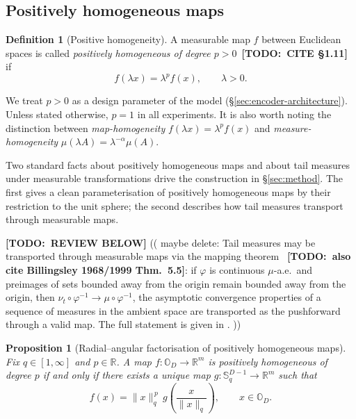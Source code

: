 \documentclass{article}
\newtheorem{proposition}[theorem]{Proposition}
\theoremstyle{definition}
\newtheorem{definition}[theorem]{Definition}
\newcommand{\todo}[1]{{\color{red}\textbf{[TODO:~#1]}}}
\begin{document}
\subsection{Positively homogeneous maps}
\label{sec:prelim:homogeneous}

\begin{definition}[Positive homogeneity]
A measurable map \(f\) between Euclidean spaces is called \emph{positively homogeneous of degree \(p>0\)}~\todo{CITE \S1.11} if 
\[
f(\lambda x)=\lambda^{p} f(x),
\qquad
\lambda>0.
\]
\end{definition}

We treat \(p>0\) as a design parameter of the model (\S\ref{sec:encoder-architecture}). Unless stated otherwise, \(p=1\) in all experiments. It is also worth noting the distinction between \emph{map-homogeneity} \(f(\lambda x)=\lambda^p f(x)\) and \emph{measure-homogeneity} \(\mu(\lambda A)=\lambda^{-\alpha}\mu(A)\).

Two standard facts about positively homogeneous maps and about tail measures under measurable transformations drive the construction in \S\ref{sec:method}. The first gives a clean parameterisation of positively homogeneous maps by their restriction to the unit sphere; the second describes how tail measures transport through measurable maps.

\todo{REVIEW BELOW}
(( maybe delete: Tail measures may be transported through measurable maps via the mapping theorem \cite[Theorem~2.3]{lindskog_regularly_2014}~\todo{also cite Billingsley 1968/1999 Thm.~5.5}: if \(\varphi\) is continuous \(\mu\)-a.e.\ and preimages of sets bounded away from the origin remain bounded away from the origin, then \(\nu_t\circ\varphi^{-1}\to\mu\circ\varphi^{-1}\), the asymptotic convergence properties of a sequence of measures in the ambient space are transported as the pushforward through a valid map. The full statement is given in . ))

\begin{proposition}[Radial--angular factorisation of positively homogeneous maps]
\label{prop:canonical-homogeneous-form}
Fix \(q\in[1,\infty]\) and \(p\in\mathbb{R}\). A map \(f:\mathbb{O}_D\to\mathbb{R}^m\) is positively homogeneous of degree \(p\) if and only if there exists a unique map \(g:\mathbb{S}^{D-1}_q\to\mathbb{R}^m\) such that
\[
f(x) = \|x\|_q^{\,p}\, g\!\left(\frac{x}{\|x\|_q}\right),
\qquad x\in\mathbb{O}_D.
\]
\end{proposition}
\end{document}
